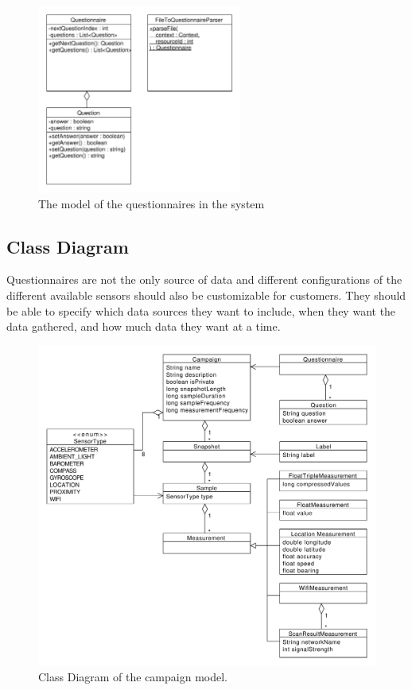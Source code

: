 \begin{figure}[!htbp]
	\centering
	\includegraphics[width=0.6\textwidth]{graphic/data_modeling/questionnaire.pdf}
	\caption{The model of the questionnaires in the system}
	\label{fig:questionnaire_model}
\end{figure}
\FloatBarrier


\subsection{Class Diagram}
\label{sub:class_diagram}

Questionnaires are not the only source of data and different configurations of the different available sensors should also be customizable for customers. They should be able to specify which data sources they want to include, when they want the data gathered, and how much data they want at a time. 

\begin{figure}[!htbp]
    \centering
    \includegraphics[width=\textwidth]{graphic/data_modeling/model_class_diagram.pdf}
    \caption{Class Diagram of the campaign model.}
    \label{fig:model_class_diagram}
\end{figure}


